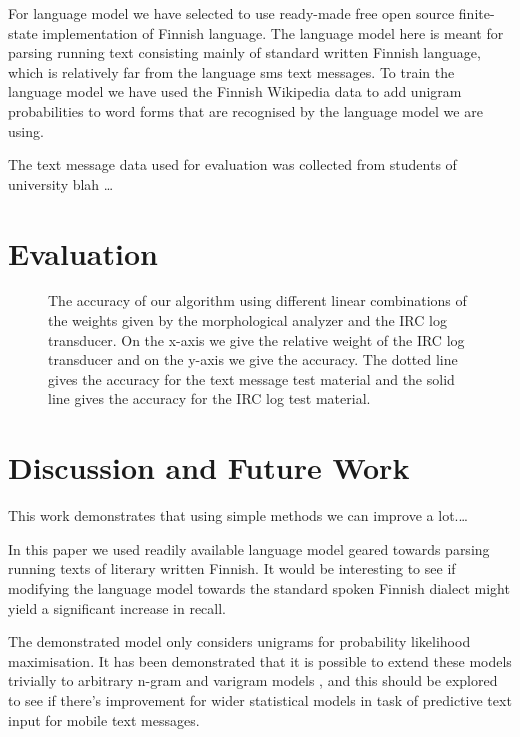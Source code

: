 \documentclass[a4paper,conference]{IEEEtran}
\begin{document}
For language model we have selected to use ready-made free open source
finite-state implementation of Finnish language\cite{pirinen/2011/nodalida}.
The language model here is meant for parsing running text consisting mainly of
standard written Finnish language, which is relatively far from the language
sms text messages.  To train the language model we have used
the Finnish Wikipedia data to add unigram probabilities to word forms that are
recognised by the language model we are using. 

The text message data used for evaluation was collected from students of
university blah \ldots

\section{Evaluation}
\label{sec:evaluation}

\begin{figure*}[!t]
\centerline{
\hfil
{}}
\caption{The accuracy of our algorithm using different linear combinations of the weights given by the morphological analyzer and the IRC log transducer. On the x-axis we give the relative weight of the IRC log transducer and on the y-axis we give the accuracy. The dotted line gives the accuracy for the text message test material and the solid line gives the accuracy for the IRC log test material.}
\label{AccuraciesIRCMaterial}
\end{figure*}

\section{Discussion and Future Work}
\label{sec:discussion}

This work demonstrates that using simple methods we can improve a lot.\ldots

In this paper we used readily available language model geared towards parsing
running texts of literary written Finnish. It would be interesting to see if
modifying the language model towards the standard spoken Finnish dialect
might yield a significant increase in recall.

The demonstrated model only considers unigrams for probability
likelihood maximisation. It has been demonstrated that it is possible
to extend these models trivially to arbitrary n-gram and varigram
models \cite{Silfverberg/2011}, and this should be explored to see if
there's improvement for wider statistical models in task of predictive
text input for mobile text messages.
\end{document}
